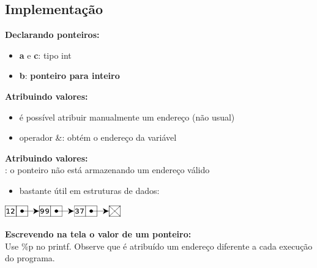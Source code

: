 \documentclass[portuguese,10pt,xcolor=table]{bredelebeamer}
\begin{document}
	\subsection{Implementação}

	\begin{frame}
		\begin{center}
			\structure{\large \insertsubsection}
		\end{center}
	\end{frame} 

	\begin{frame}
		\textbf{Declarando ponteiros:}\\
				
				\begin{itemize}
					\item \textbf{a} e \textbf{c}: tipo int
					\item \textbf{b}: \textbf{ponteiro para inteiro}
				\end{itemize}
	\end{frame}

	\begin{frame}
		\textbf{Atribuindo valores:}\\
				
				\begin{itemize}
					\item é possível atribuir manualmente um endereço (não usual)
					\item operador \&: obtém o endereço da variável
		\end{itemize}
	\end{frame}

	
	\begin{frame}
		\textbf{Atribuindo valores:}\\
				
				: o ponteiro não está armazenando um endereço válido
	
				\begin{itemize}
					\item bastante útil em estruturas de dados:
				\end{itemize}
						\includegraphics[height=0.5cm]{linkedlist.png}\\
	\end{frame}
	
	\begin{frame}
		\textbf{Escrevendo na tela o valor de um ponteiro:}\\
				
				Use \%p no printf. Observe que é atribuído um endereço diferente a cada execução do programa.
	\end{frame}
	
\end{document}
